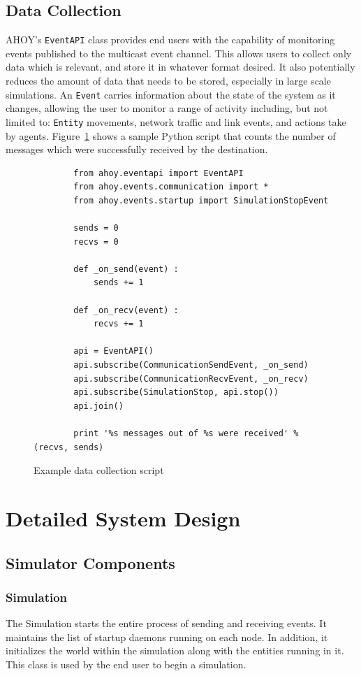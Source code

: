 \documentclass[titlepage]{article}
\begin{document}
\subsection{Data Collection}
\label{sec:data_collection}
AHOY's \texttt{EventAPI} class provides end users with the capability of monitoring events published to the multicast event channel.  This allows users to collect only data which is relevant, and store it in whatever format desired.  It also potentially reduces the amount of data that needs to be stored, especially in large scale simulations.  An \texttt{Event} carries information about the state of the system as it changes, allowing the user to monitor a range of activity including, but not limited to: \texttt{Entity} movements, network traffic and link events, and actions take by agents.  Figure~\ref{fig:exdatacollect} shows a sample Python script that counts the number of messages which were successfully received by the destination.

\begin{figure}
    \begin{verbatim}
        from ahoy.eventapi import EventAPI
        from ahoy.events.communication import *
        from ahoy.events.startup import SimulationStopEvent

        sends = 0
        recvs = 0

        def _on_send(event) :
            sends += 1

        def _on_recv(event) :
            recvs += 1

        api = EventAPI()
        api.subscribe(CommunicationSendEvent, _on_send)
        api.subscribe(CommunicationRecvEvent, _on_recv)
        api.subscribe(SimulationStop, api.stop())
        api.join()

        print '%s messages out of %s were received' % (recvs, sends)
    \end{verbatim}
    \caption{Example data collection script}
    \label{fig:exdatacollect}
\end{figure}

\section{Detailed System Design}
\subsection{Simulator Components}
\subsubsection{Simulation}
{The Simulation starts the entire process of sending and receiving events.  It maintains the list of startup daemons running on each node. In addition, it initializes the world within the simulation along with the entities running in it.  This class is used by the end user to begin a simulation.}
\end{document}
